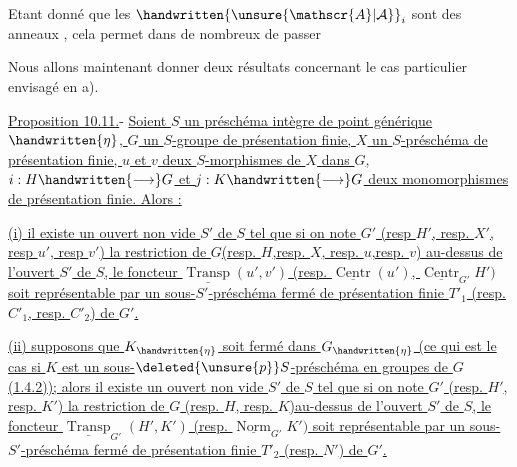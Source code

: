 Etant donné que les $\handwritten{\unsure{\mathscr{A}|\mathcal{A}}}_i$ sont des anneaux  , cela permet dans de nombreux de passer

Nous allons maintenant donner deux résultats concernant le cas particulier envisagé en a).

\uline{Proposition 10.11.}- \uline{Soient $S$ un préschéma intègre de point générique $\handwritten{\eta}$, $G$ un $S$-groupe de présentation finie, $X$ un $S$-préschéma de présentation finie, $u$ et $v$ deux $S$-morphismes de $X$ dans $G$, $i:H\handwritten{\longrightarrow}G$ et $j:K\handwritten{\longrightarrow}G$ deux monomorphismes de présentation finie. Alors :}

\uline{(i) il existe un ouvert non vide $S'$ de $S$ tel que si on note $G'$ (resp $H'$, resp. $X'$, resp $u'$, resp $v'$) la restriction de $G$(resp. $H$,resp. $X$, resp. $u$,resp. $v$) au-dessus de l'ouvert $S'$ de $S$, le foncteur $\underline{\operatorname{Transp}}(u',v')$ (resp. $\underline{\operatorname{Centr}}(u')$, $\underline{\operatorname{Centr}}_{G'}H')$ soit représentable par un sous-$S'$-préschéma fermé de présentation finie $T'_1$ (resp. $C'_1$, resp. $C'_2$) de $G'$.}

\uline{(ii) supposons que $K_{\handwritten{\eta}}$ soit fermé dans $G_{\handwritten{\eta}}$ (ce qui est le cas si $K$ est un sous-$\deleted{\unsure{p}}S$-préschéma en groupes de $G$ (1.4.2)); alors il existe un ouvert non vide $S'$ de $S$ tel que si on note $G'$ (resp. $H'$, resp. $K'$) la restriction de $G$ (resp. $H$, resp. $K$)au-dessus de l'ouvert $S'$ de $S$, le foncteur $\underline{\operatorname{Transp}}_{G'}(H',K')$ (resp. $\underline{\operatorname{Norm}}_{G'}K')$ soit représentable par un sous-$S'$-préschéma fermé de présentation finie $T'_2$ (resp. $N'$) de $G'$.}

